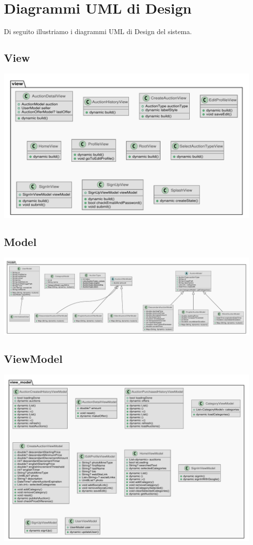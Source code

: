 \pagebreak

\section{Diagrammi UML di Design}
Di seguito illustriamo i diagrammi UML di Design del sistema.
\subsection{View}
\includegraphics[width=\textwidth]{assets/uml_design/view.pdf}
\subsection{Model}
\includegraphics[width=\textwidth]{assets/uml_design/model.pdf}
\subsection{ViewModel}
\includegraphics[width=\textwidth]{assets/uml_design/view_model.pdf}

